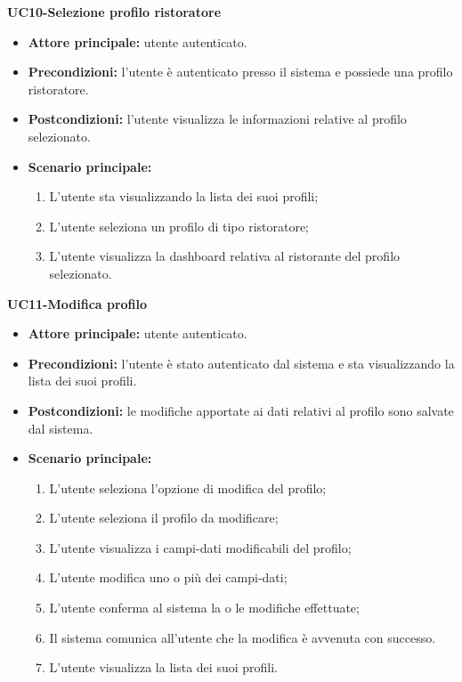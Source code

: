 \textbf{UC10-Selezione profilo ristoratore}
\begin{itemize}
\item \textbf{Attore principale:} utente autenticato.
\item \textbf{Precondizioni:} l'utente è autenticato presso il sistema e possiede una profilo ristoratore.
\item \textbf{Postcondizioni:} l'utente visualizza le informazioni relative al profilo selezionato.
\item \textbf{Scenario principale:}
\begin{enumerate}
    \item L'utente sta visualizzando la lista dei suoi profili;
    \item L'utente seleziona un profilo di tipo ristoratore;
    \item L'utente visualizza la dashboard relativa al ristorante del profilo selezionato.
\end{enumerate}
\end{itemize}

\textbf{UC11-Modifica profilo }
\begin{itemize}
\item \textbf{Attore principale:} utente autenticato.
\item \textbf{Precondizioni:} l'utente è stato autenticato dal sistema e sta visualizzando la lista dei suoi profili.
\item \textbf{Postcondizioni:} le modifiche apportate ai dati relativi al profilo sono salvate dal sistema.
\item \textbf{Scenario principale:}
\begin{enumerate}
    \item L'utente seleziona l'opzione di modifica del profilo;
    \item L'utente seleziona il profilo da modificare;
    \item L'utente visualizza i campi-dati modificabili del profilo;
    \item L'utente modifica uno o più dei campi-dati;
    \item L'utente conferma al sistema la o le modifiche effettuate;
    \item Il sistema comunica all'utente che la modifica è avvenuta con successo.
    \item L'utente visualizza la lista dei suoi profili.
\end{enumerate}
\end{itemize}

